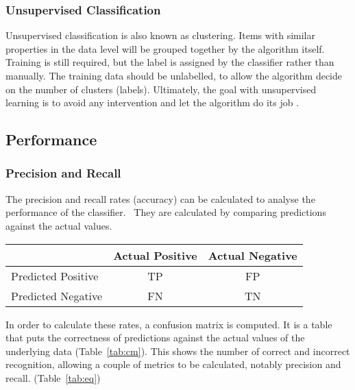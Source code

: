 \documentclass[lit_review.tex]{subfiles}
\begin{document}
\subsubsection{Unsupervised Classification}
Unsupervised classification is also known as clustering. Items with similar properties in the data level will be grouped together by the algorithm itself. Training is still required, but the label is assigned by the classifier rather than manually. The training data should be unlabelled, to allow the algorithm decide on the number of clusters (labels). Ultimately, the goal with unsupervised learning is to avoid any intervention and let the algorithm do its job \cite{hall-notes}. 


\subsection{Performance}
\subsubsection{Precision and Recall}
The precision and recall rates (accuracy) can be calculated to analyse the performance of the classifier.~\cite{precision-recall} They are calculated by comparing predictions against the actual values.

\parbox{\linewidth} {
  \centering
  \begin{tabular}{|l|c|c|}
    \hline
                        & Actual Positive & Actual Negative
    \\ \hline
    Predicted Positive  & TP              & FP
    \\ \hline
    Predicted Negative  & FN              & TN
    \\ \hline
  \end{tabular}

  \label{tab:cm}
}

In order to calculate these rates, a confusion matrix is computed. It is a table that puts the correctness of predictions against the actual values of the underlying data (Table~\ref{tab:cm}). This shows the number of correct and incorrect recognition, allowing a couple of metrics to be calculated, notably precision and recall. (Table~\ref{tab:eq}) 
\end{document}
